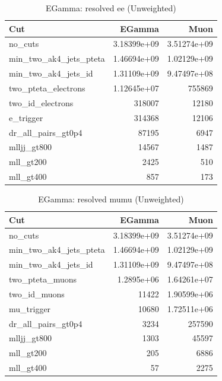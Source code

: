 \documentclass{article}
\begin{document}
\begin{table}[htbp]
\centering
\caption{EGamma: resolved ee (Unweighted)}
\begin{tabular}{lrr}
\hline
Cut & EGamma & Muon \\
\hline
no\_cuts & 3.18399e+09 & 3.51274e+09 \\
min\_two\_ak4\_jets\_pteta & 1.46694e+09 & 1.02129e+09 \\
min\_two\_ak4\_jets\_id & 1.31109e+09 & 9.47497e+08 \\
two\_pteta\_electrons & 1.12645e+07 & 755869 \\
two\_id\_electrons & 318007 & 12180 \\
e\_trigger & 314368 & 12106 \\
dr\_all\_pairs\_gt0p4 & 87195 & 6947 \\
mlljj\_gt800 & 14567 & 1487 \\
mll\_gt200 & 2425 & 510 \\
mll\_gt400 & 857 & 173 \\
\hline
\end{tabular}
\end{table}

\begin{table}[htbp]
\centering
\caption{EGamma: resolved mumu (Unweighted)}
\begin{tabular}{lrr}
\hline
Cut & EGamma & Muon \\
\hline
no\_cuts & 3.18399e+09 & 3.51274e+09 \\
min\_two\_ak4\_jets\_pteta & 1.46694e+09 & 1.02129e+09 \\
min\_two\_ak4\_jets\_id & 1.31109e+09 & 9.47497e+08 \\
two\_pteta\_muons & 1.2895e+06 & 1.64261e+07 \\
two\_id\_muons & 11422 & 1.90599e+06 \\
mu\_trigger & 10680 & 1.72511e+06 \\
dr\_all\_pairs\_gt0p4 & 3234 & 257590 \\
mlljj\_gt800 & 1303 & 45597 \\
mll\_gt200 & 205 & 6886 \\
mll\_gt400 & 57 & 2275 \\
\hline
\end{tabular}
\end{table}
\end{document}
